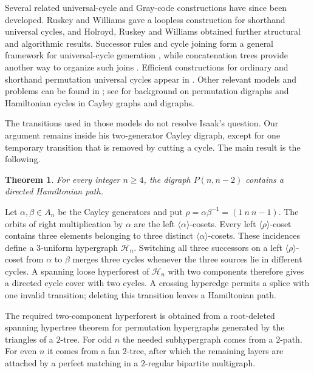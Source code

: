 \documentclass[4pt]{article} %
\newtheorem{theorem}{Theorem}[section]
\newcommand{\la}{\langle}
\newcommand{\ra}{\rangle}
\begin{document}
Several related universal-cycle and Gray-code constructions have since been
developed. Ruskey and Williams \cite{Ruskey2010} gave a loopless construction
for shorthand universal cycles, and Holroyd, Ruskey and Williams
\cite{Holroyd2012} obtained further structural and algorithmic results.
Successor rules and cycle joining form a general framework for universal-cycle
generation \cite{Gabric2020}, while concatenation trees provide another way
to organize such joins \cite{Sawada2023}. Efficient constructions for
ordinary and shorthand permutation universal cycles appear in
\cite{Chang2025,Chang2026}. Other relevant models and problems can be found
in \cite{Jackson2009,Johnson2009,Gao2019,Wong2017}; see
\cite{Brunat1997,Curren1996,Witte1984} for background on permutation digraphs
and Hamiltonian cycles in Cayley graphs and digraphs.

The transitions used in those models do not resolve Isaak's question. Our
argument remains inside his two-generator Cayley digraph, except for one
temporary transition that is removed by cutting a cycle. The main result is
the following.

\begin{theorem}\label{thm:main}
For every integer $n\geq4$, the digraph $P(n,n-2)$ contains a directed
Hamiltonian path.
\end{theorem}

Let $\alpha,\beta\in A_n$ be the Cayley generators and put
$
 \rho=\alpha\beta^{-1}=(1\ n\ n-1).$
The orbits of right multiplication by $\alpha$ are the left
$\la\alpha\ra$-cosets. Every left $\la\rho\ra$-coset contains three elements
belonging to three distinct $\la\alpha\ra$-cosets. These incidences define a
$3$-uniform hypergraph $\mathcal H_n$. Switching all three successors on a
left $\la\rho\ra$-coset from $\alpha$ to $\beta$ merges three cycles whenever
the three sources lie in different cycles. A spanning loose hyperforest of
$\mathcal H_n$ with two components therefore gives a directed cycle cover
with two cycles. A crossing hyperedge permits a splice with one invalid
transition; deleting this transition leaves a Hamiltonian path.

The required two-component hyperforest is obtained from a root-deleted
spanning hypertree theorem for permutation hypergraphs generated by the
triangles of a $2$-tree. For odd $n$ the needed subhypergraph comes from a
$2$-path. For even $n$ it comes from a fan $2$-tree, after which the
remaining layers are attached by a perfect matching in a $2$-regular
bipartite multigraph.
\end{document}
